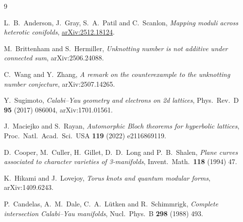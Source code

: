 \documentclass[7pt]{article}
\begin{document}
\begin{thebibliography}{9}

L.~B.~Anderson, J.~Gray, S.~A.~Patil and C.~Scanlon,
\emph{Mapping moduli across heterotic conifolds},
\href{https://arxiv.org/abs/2512.18124}{arXiv:2512.18124}.


 M.~Brittenham and S.~Hermiller,
\emph{Unknotting number is not additive under connected sum},
arXiv:2506.24088.

 C.~Wang and Y.~Zhang,
\emph{A remark on the counterexample to the unknotting number conjecture},
arXiv:2507.14265.

 Y.~Sugimoto,
\emph{Calabi--Yau geometry and electrons on 2d lattices},
Phys.\ Rev.\ D \textbf{95} (2017) 086004, arXiv:1701.01561.

 J.~Maciejko and S.~Rayan,
\emph{Automorphic Bloch theorems for hyperbolic lattices},
Proc.\ Natl.\ Acad.\ Sci.\ USA \textbf{119} (2022) e2116869119.

 D.~Cooper, M.~Culler, H.~Gillet, D.~D.~Long and
P.~B.~Shalen, \emph{Plane curves associated to character varieties of
3-manifolds}, Invent.\ Math.\ \textbf{118} (1994) 47.

 K.~Hikami and J.~Lovejoy,
\emph{Torus knots and quantum modular forms},
arXiv:1409.6243.

 P.~Candelas, A.~M.~Dale, C.~A.~L\"utken and
R.~Schimmrigk, \emph{Complete intersection Calabi--Yau manifolds},
Nucl.\ Phys.\ B \textbf{298} (1988) 493.



\end{thebibliography}
\end{document}
